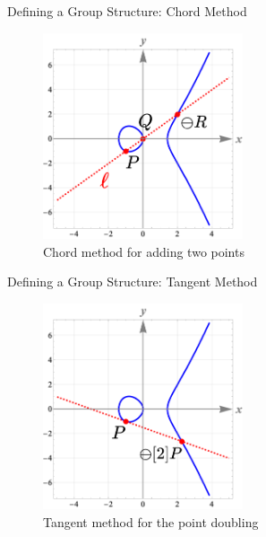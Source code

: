 \documentclass{zkdl-presentation-template}
\begin{document}
    \begin{frame}{Defining a Group Structure: Chord Method}
        \begin{figure}
            \centering
            \includegraphics[width=0.525\textwidth]{images/lecture_3/ec_illustration_4.png}
            \caption{Chord method for adding two points}
            \label{fig:ec_4}
        \end{figure}
    \end{frame}

    \begin{frame}{Defining a Group Structure: Tangent Method}
        \begin{figure}
            \centering
            \includegraphics[width=0.525\textwidth]{images/lecture_3/ec_illustration_5.png}
            \caption{Tangent method for the point doubling}
            \label{fig:ec_5}
        \end{figure}
    \end{frame}
\end{document}
